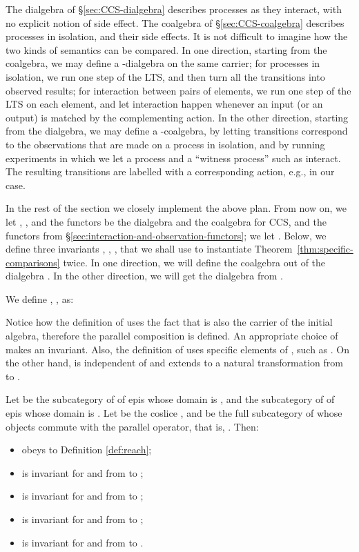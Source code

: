 \documentclass[orivec]{llncs}
\newcommand{\defend}{}
\renewenvironment{definition}{\begin{defn}}{\defend\end{defn}}
\begin{document}
The dialgebra of \S \ref{sec:CCS-dialgebra} describes processes as they interact, with no explicit notion of side effect. The coalgebra of \S \ref{sec:CCS-coalgebra} describes processes in isolation, and their side effects.
It is not difficult to imagine how the two kinds of semantics can be compared. In one direction, starting from the coalgebra, we may define a -dialgebra on the same carrier; for processes in isolation, we run one step of the LTS, and then turn all the  transitions into observed results; for interaction between pairs of elements, we run one step of the LTS on each element, and let interaction happen whenever an input (or an output) is matched by the complementing action. In the other direction, starting from the dialgebra, we may define a -coalgebra, by letting  transitions correspond to the observations that are made on a process in isolation, and by running experiments in which we let a process and a ``witness process'' such as  interact. The resulting transitions are labelled with a corresponding action, e.g.,  in our case. 

In the rest of the section we closely implement the above plan. From now on, we let , , and the functors  be the dialgebra and the coalgebra for CCS, and the functors from \S \ref{sec:interaction-and-observation-functors}; we let . Below, we define three invariants , , , that we shall use to instantiate Theorem~\ref{thm:specific-comparisons} twice. In one direction, we will define the coalgebra  out of the dialgebra . In the other direction, we will get the dialgebra  from .

\begin{definition}\label{def:CCS-invariants}
	We define , ,  as:
	
\end{definition}

Notice how the definition of  uses the fact that  is also the carrier of the initial algebra, therefore the parallel composition  is defined. An appropriate choice of  makes  an invariant. Also, the definition of  uses specific elements of , such as . On the other hand,  is independent of  and extends to a natural transformation from  to .

\begin{proposition}\label{prop:invariants-CCS}
 Let  be the subcategory of  of epis whose domain is , and  the subcategory of  of epis whose domain is .
 	Let  be the coslice , and  be the full subcategory of  whose objects  commute with the parallel operator, that is, . Then:
\begin{itemize}	
        \item  obeys to Definition \ref{def:reach};

	\item  is invariant for  and  from  to ; 
	
	\item  is invariant for  and  from  to ; 
	
	\item  is invariant for  and  from  to ; 
	
	\item  is invariant for  and  from  to .  
\end{itemize}
\end{proposition}
\end{document}
